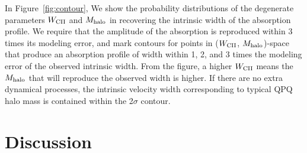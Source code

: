 \documentclass[iop]{emulateapj}
\begin{document}
In Figure~\ref{fig:contour}, We show the probability distributions of the degenerate parameters
$W_{\rm CII}$ and $M_{\rm halo}$ in recovering the intrinsic width of the absorption profile. We
require that the amplitude of the absorption is reproduced within 3 times its modeling error, and
mark contours for points in ($W_{\rm CII}$, $M_{\rm halo}$)-space that produce an absorption
profile of width within 1, 2, and 3 times the modeling error of the observed intrinsic width.
From the figure, a higher $W_{\rm CII}$ means the $M_{\rm halo}$ that will reproduce the observed
width is higher. If there are no extra dynamical processes, the intrinsic velocity width
corresponding to typical QPQ halo mass is contained within the 2$\sigma$ contour.

\section{Discussion}
\label{sec:discussion}

\end{document}
